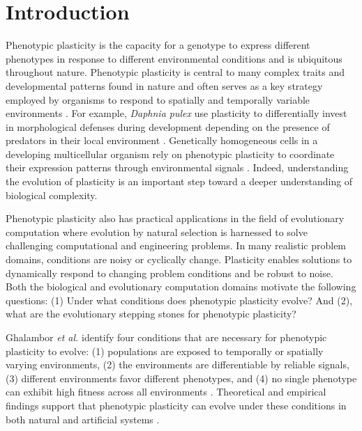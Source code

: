\section{Introduction}
\label{chapter:origins-of-plasticity:sec:introduction}

Phenotypic plasticity is the capacity for a genotype to express different phenotypes in response to different environmental conditions \citep{ghalambor_behavior_2010} and is ubiquitous throughout nature. 
Phenotypic plasticity is central to many complex traits and developmental patterns found in nature and often serves as a key strategy employed by organisms to respond to spatially and temporally variable environments \citep{bradshaw_evolutionary_1965,murren_constraints_2015}.
For example, \textit{Daphnia pulex} use plasticity to differentially invest in morphological defenses during development depending on the presence of predators in their local environment \citep{black_demographic_1990}. 
Genetically homogeneous cells in a developing multicellular organism rely on phenotypic plasticity to coordinate their expression patterns through environmental signals \citep{schlichting_origins_2003}.
Indeed, understanding the evolution of plasticity is an important step toward a deeper understanding of biological complexity. 

Phenotypic plasticity also has practical applications in the field of evolutionary computation where evolution by natural selection is harnessed to solve challenging computational and engineering problems. 
In many realistic problem domains, conditions are noisy or cyclically change. 
Plasticity enables solutions to dynamically respond to changing problem conditions and be robust to noise. 
Both the biological and evolutionary computation domains motivate the following questions: 
(1) Under what conditions does phenotypic plasticity evolve? 
And (2), what are the evolutionary stepping stones for phenotypic plasticity? 

Ghalambor \textit{et al.} identify four conditions that are necessary for phenotypic plasticity to evolve: 
(1) populations are exposed to temporally or spatially varying environments, 
(2) the environments are differentiable by reliable signals, 
(3) different environments favor different phenotypes, and 
(4) no single phenotype can exhibit high fitness across all environments \citep{ghalambor_behavior_2010}. 
Theoretical and empirical findings support that phenotypic plasticity can evolve under these conditions in both natural and artificial systems \citep{clune_investigating_2007,goldsby_evolution_2010,goldsby_evolutionary_2014,hallsson_selection_2012,nolfi_phenotypic_1994}.

